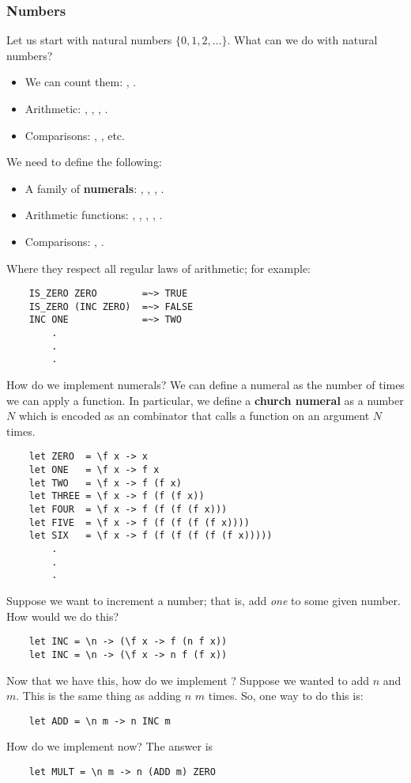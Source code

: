 \documentclass[letterpaper]{article}
\begin{document}
\subsubsection{Numbers}
Let us start with natural numbers $\{0, 1, 2, \dots\}$. What can we do with natural numbers? 
\begin{itemize}
    \item We can count them: , . 
    \item Arithmetic: , \code{+}, \code{-}, \code{*}.
    \item Comparisons: \code{==}, \code{<=}, etc. 
\end{itemize}
We need to define the following: 
\begin{itemize}
    \item A family of \textbf{numerals}: , , , .
    \item Arithmetic functions: , , , , .
    \item Comparisons: , .
\end{itemize}
Where they respect all regular laws of arithmetic; for example: 
\begin{verbatim}
    IS_ZERO ZERO        =~> TRUE 
    IS_ZERO (INC ZERO)  =~> FALSE 
    INC ONE             =~> TWO 
        .
        . 
        .
\end{verbatim}
How do we implement numerals? We can define a numeral as the number of times we can apply a function. In particular, we define a \textbf{church numeral} as a number $N$ which is encoded as an combinator that calls a function on an argument $N$ times. 
\begin{verbatim}
    let ZERO  = \f x -> x
    let ONE   = \f x -> f x
    let TWO   = \f x -> f (f x)
    let THREE = \f x -> f (f (f x))
    let FOUR  = \f x -> f (f (f (f x)))
    let FIVE  = \f x -> f (f (f (f (f x))))
    let SIX   = \f x -> f (f (f (f (f (f x)))))
        .
        .
        .
\end{verbatim} 
Suppose we want to increment a number; that is, add \emph{one} to some given number. How would we do this? 
\begin{verbatim}
    let INC = \n -> (\f x -> f (n f x))
    let INC = \n -> (\f x -> n f (f x))
\end{verbatim}
Now that we have this, how do we implement ? Suppose we wanted to add $n$ and $m$. This is the same thing as adding $n$ $m$ times. So, one way to do this is: 
\begin{verbatim}
    let ADD = \n m -> n INC m
\end{verbatim}
How do we implement  now? The answer is 
\begin{verbatim}
    let MULT = \n m -> n (ADD m) ZERO 
\end{verbatim}
\end{document}
